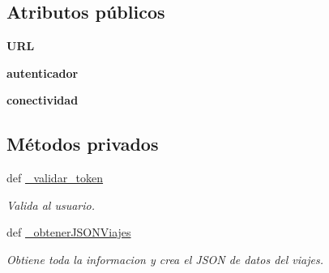 \subsection*{Atributos públicos}
\begin{DoxyCompactItemize}
\item 
\hypertarget{classsrc_1_1resources_1_1obtener_posibles_viajes_1_1_obtener_posibles_viajes_ada78b75cd57a6304f365ab79954e062b}{{\bfseries U\-R\-L}}\label{classsrc_1_1resources_1_1obtener_posibles_viajes_1_1_obtener_posibles_viajes_ada78b75cd57a6304f365ab79954e062b}

\item 
\hypertarget{classsrc_1_1resources_1_1obtener_posibles_viajes_1_1_obtener_posibles_viajes_ab67410503478154e68e81ce1b95516b2}{{\bfseries autenticador}}\label{classsrc_1_1resources_1_1obtener_posibles_viajes_1_1_obtener_posibles_viajes_ab67410503478154e68e81ce1b95516b2}

\item 
\hypertarget{classsrc_1_1resources_1_1obtener_posibles_viajes_1_1_obtener_posibles_viajes_a5e41d7615e9ce1d123792246f61b1e4f}{{\bfseries conectividad}}\label{classsrc_1_1resources_1_1obtener_posibles_viajes_1_1_obtener_posibles_viajes_a5e41d7615e9ce1d123792246f61b1e4f}

\end{DoxyCompactItemize}
\subsection*{Métodos privados}
\begin{DoxyCompactItemize}
\item 
def \hyperlink{classsrc_1_1resources_1_1obtener_posibles_viajes_1_1_obtener_posibles_viajes_a7f4c696de51b7e99028c851b5b25648f}{\-\_\-validar\-\_\-token}
\begin{DoxyCompactList}\small\item\em Valida al usuario. \end{DoxyCompactList}\item 
def \hyperlink{classsrc_1_1resources_1_1obtener_posibles_viajes_1_1_obtener_posibles_viajes_abf3d98b7d87231a0fee98474aa94261f}{\-\_\-obtener\-J\-S\-O\-N\-Viajes}
\begin{DoxyCompactList}\small\item\em Obtiene toda la informacion y crea el J\-S\-O\-N de datos del viajes. \end{DoxyCompactList}\end{DoxyCompactItemize}


